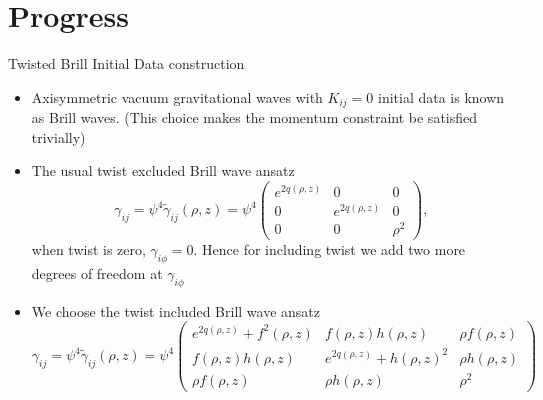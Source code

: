 \documentclass[9pt]{beamer}
\begin{document}
\section{Progress}
\begin{frame}{Twisted Brill Initial Data construction}
\begin{itemize}

    \item Axisymmetric vacuum gravitational waves with $K_{ij}=0$ initial data is known as Brill waves. (This choice makes the momentum constraint be satisfied trivially)

    \item The usual twist excluded Brill wave ansatz 
\[
\gamma_{ij} = \psi^4 \tilde{\gamma}_{ij}(\rho,z)  = 
\psi ^4\begin{pmatrix}
    e^{2q(\rho,z)} & 0 & 0 \\
    0 & e^{2q(\rho,z)} & 0 \\
    0 & 0 & \rho^{2}
\end{pmatrix},

\]
when twist is zero, $\gamma_{i\phi} = 0$. Hence for including twist we add two more degrees of freedom at $\gamma_{i \phi}$

 \item We choose the twist included Brill wave ansatz 
    \[
\gamma_{ij} = \psi^4 \tilde{\gamma}_{ij}(\rho,z) =
\psi ^4\begin{pmatrix}
    e^{2q(\rho,z)} + f^2(\rho,z) & f(\rho,z)h(\rho,z) & \rho f(\rho,z) \\
    f(\rho,z)h(\rho,z) & e^{2q(\rho,z)} + h(\rho,z)^2 & \rho h(\rho,z) \\
    \rho f(\rho,z) & \rho h(\rho,z) & \rho^{2}
\end{pmatrix}
\]

\end{itemize}
\end{frame}
\end{document}
